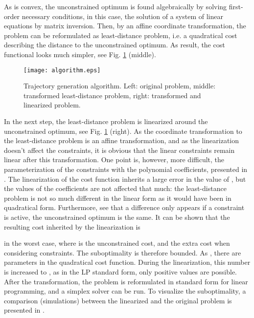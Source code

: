\documentclass[a4paper,11pt,fleqn]{article}
\begin{document}
As  is convex, the unconstrained optimum is found algebraically by solving first-order necessary conditions, in this case, the solution of a system of linear equations by matrix inversion. Then, by an affine coordinate transformation, the problem can be reformulated as least-distance problem, i.e. a quadratical cost describing the distance to the unconstrained optimum. As result, the cost functional looks much simpler, see Fig. \ref{fig:algorithm} (middle).




\begin{figure}[!htb]
  \centering
  \texttt{[image: algorithm.eps]}
  \caption{Trajectory generation algorithm. Left: original problem, middle: transformed least-distance problem, right: transformed and linearized problem.\label{fig:algorithm}}
\end{figure}



In the next step, the least-distance problem is linearized around the unconstrained optimum, see Fig. \ref{fig:algorithm} (right). As the coordinate transformation to the least-distance problem is an affine transformation, and as the linearization doesn't affect the constraints, it is obvious that the linear constraints remain linear after this transformation. One point is, however, more difficult, the parameterization of the constraints with the polynomial coefficients, presented in \cite{SK10}. The linearization of the cost function inherits a large error in the value of , but the values of the coefficients  are not affected that much: the least-distance problem is not so much different in the linear form as it would have been in quadratical form. Furthermore, see that a difference only appears if a constraint is active, the unconstrained optimum is the same. It can be shown that the resulting cost inherited by the linearization is

in the worst case, where  is the unconstrained cost, and  the extra cost when considering constraints. The suboptimality is therefore bounded. As , there are  parameters in the quadratical cost function. During the linearization, this number is increased to , as in the LP standard form, only positive values are possible. After the transformation, the problem is reformulated in standard form for linear programming, and a simplex solver \cite{LPalg} can be run. To visualize the suboptimality, a comparison (simulations) between the linearized and the original problem is presented in \cite{SK10}. 
\end{document}
